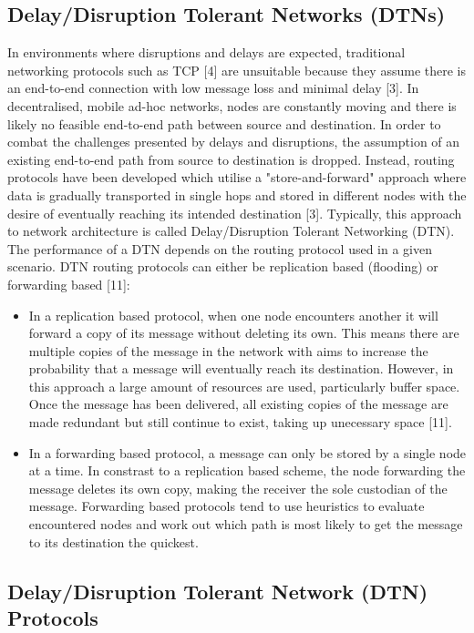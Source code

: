 \documentclass{article}
\begin{document}
\subsection{Delay/Disruption Tolerant Networks (DTNs)}
In environments where disruptions and delays are expected, traditional networking protocols such as TCP [4] are unsuitable because they assume there is an end-to-end connection with low message loss and minimal delay [3]. In decentralised, mobile ad-hoc networks, nodes are constantly moving and there is likely no feasible end-to-end path between source and destination. In order to combat the challenges presented by delays and disruptions, the assumption of an existing end-to-end path from source to destination is dropped. Instead, routing protocols have been developed which utilise a "store-and-forward" approach where data is gradually transported in single hops and stored in different nodes with the desire of eventually reaching its intended destination [3]. Typically, this approach to network architecture is called Delay/Disruption Tolerant Networking (DTN).\\
\noindent The performance of a DTN depends on the routing protocol used in a given scenario. DTN routing protocols can either be replication based (flooding) or forwarding based [11]:\\
\begin{itemize}
	\item In a replication based protocol, when one node encounters another it will forward a copy of its message without deleting its own. This means there are multiple copies of the message in the network with aims to increase the probability that a message will eventually reach its destination. However, in this approach a large amount of resources are used, particularly buffer space. Once the message has been delivered, all existing copies of the message are made redundant but still continue to exist, taking up unecessary space [11].
	\item In a forwarding based protocol, a message can only be stored by a single node at a time. In constrast to a replication based scheme, the node forwarding the message deletes its own copy, making the receiver the sole custodian of the message. Forwarding based protocols tend to use heuristics to evaluate encountered nodes and work out which path is most likely to get the message to its destination the quickest.
\end{itemize}
\newpage

\subsection{Delay/Disruption Tolerant Network (DTN) Protocols}
\end{document}
